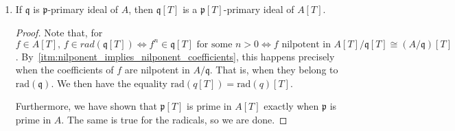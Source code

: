 \begin{problem}
\begin{enumerate}[label=(\theproblem.\arabic*),ref=\theproblem.\arabic*]
\begin{sol}
\begin{proof}
                Now, let $\mathfrak{p}$ be a minimal prime of $I$.
                $\mathfrak{p}[T]$ must contain a minimal prime of $I[T]$, say, $\mathfrak{p}'[T]$
                Then, we take the contraction $I \subseteq \mathfrak{p}' \subseteq \mathfrak{p}$
                and by definition of $\mathfrak{p}$ being a minimal of $I$,
                we conclude that $\mathfrak{p}' = \mathfrak{p}$ and $\mathfrak{p}'[T] = \mathfrak{p}[T]$.
                Thus, $\mathfrak{p}[T]$ is a minimal prime of $I[T]$.

            \end{proof}
        \end{sol}

        \item\label{itm:p_primary_implies_pt_primary} If $\mathfrak{q}$ is $\mathfrak{p}$-primary ideal of $A$, then $\mathfrak{q}[T]$ is a $\mathfrak{p}[T]$-primary ideal of $A[T]$.
        \begin{sol}

            \begin{proof}

            Note that, for $ f \in A[T], \, f \in rad(\mathfrak{q}[T]) \Leftrightarrow f^n \in \mathfrak{q}[T] \text{ for some } n > 0
            \Leftrightarrow f \text{ nilpotent in } A[T] / \mathfrak{q}[T] \cong (A/\mathfrak{q})[T]$.
            By~\ref{itm:nilponent_implies_nilponent_coefficients}, this happens precisely when
            the coefficients of $f$ are nilpotent in $A/\mathfrak{q}$.
            That is, when they belong to $\text{rad}(\mathfrak{q})$.
            We then have the equality $\text{rad}(q[T]) = \text{rad}(q)[T]$.

            Furthermore, we have shown that $\mathfrak{p}[T]$ is prime in $A[T]$ exactly when $\mathfrak{p}$ is prime in $A$.
            The same is true for the radicals, so we are done.
            \end{proof}


        \end{sol}


\end{enumerate}
\end{problem}
